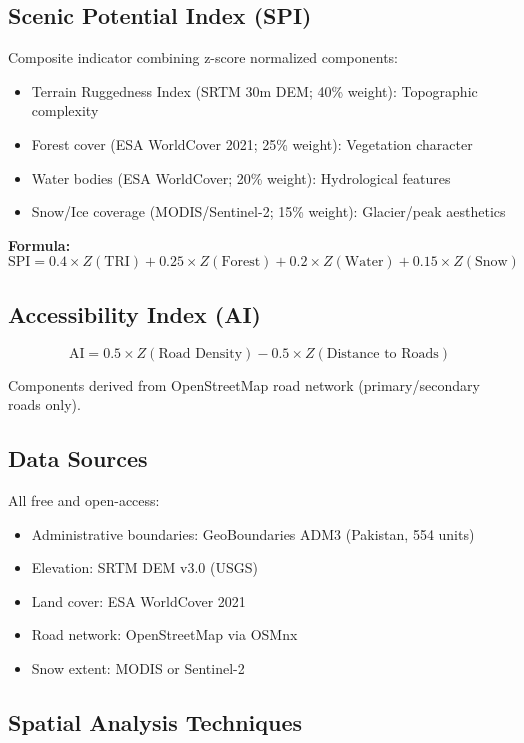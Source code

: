 \documentclass[12pt, a4paper]{article}
\begin{document}
\subsection{Scenic Potential Index (SPI)}

Composite indicator combining z-score normalized components:
\begin{itemize}
    \item Terrain Ruggedness Index (SRTM 30m DEM; 40\% weight): Topographic complexity
    \item Forest cover (ESA WorldCover 2021; 25\% weight): Vegetation character
    \item Water bodies (ESA WorldCover; 20\% weight): Hydrological features
    \item Snow/Ice coverage (MODIS/Sentinel-2; 15\% weight): Glacier/peak aesthetics
\end{itemize}

\noindent\textbf{Formula:}
\[
\text{SPI} = 0.4 \times Z(\text{TRI}) + 0.25 \times Z(\text{Forest}) + 0.2 \times Z(\text{Water}) + 0.15 \times Z(\text{Snow})
\]

\subsection{Accessibility Index (AI)}

\[
\text{AI} = 0.5 \times Z(\text{Road Density}) - 0.5 \times Z(\text{Distance to Roads})
\]

Components derived from OpenStreetMap road network (primary/secondary roads only).

\subsection{Data Sources}

All free and open-access:
\begin{itemize}
    \item Administrative boundaries: GeoBoundaries ADM3 (Pakistan, 554 units)
    \item Elevation: SRTM DEM v3.0 (USGS)
    \item Land cover: ESA WorldCover 2021
    \item Road network: OpenStreetMap via OSMnx
    \item Snow extent: MODIS or Sentinel-2
\end{itemize}

\subsection{Spatial Analysis Techniques}
\end{document}
